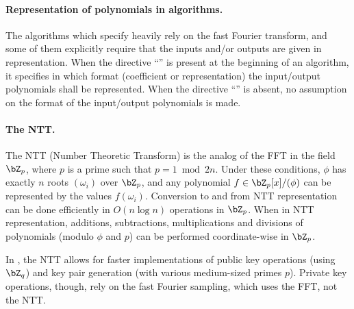\paragraph{Representation of polynomials in algorithms.} The algorithms which specify \falcon heavily rely on the fast Fourier transform, and some of them explicitly require that the inputs and/or outputs are given in \fft representation. When the directive ``\algorithmicformat'' is present at the beginning of an algorithm, it specifies in which format (coefficient or \fft representation) the input/output polynomials shall be represented. When the directive ``\algorithmicformat'' is absent, no assumption on the format of the input/output polynomials is made.

\paragraph{The NTT.} The NTT (Number Theoretic Transform) is the analog
of the FFT in the field $\bZ_p$, where $p$ is a prime such that $p = 1
\bmod 2n$. Under these
conditions, $\phi$ has exactly $n$ roots $(\omega_i)$ over $\bZ_p$, and
any polynomial $f \in \bZ_p[x]/(\phi)$ can be represented by the values
$f(\omega_i)$. Conversion to and from NTT representation can be done
efficiently in $O(n \log n)$ operations in $\bZ_p$. When in NTT
representation, additions, subtractions, multiplications and divisions
of polynomials (modulo $\phi$ and $p$) can be performed coordinate-wise
in $\bZ_p$.

In \falcon, the NTT allows for faster
implementations of public key operations (using $\bZ_q$) and key pair
generation (with various medium-sized primes $p$). Private key
operations, though, rely on the fast Fourier sampling, which uses the
FFT, not the NTT.
